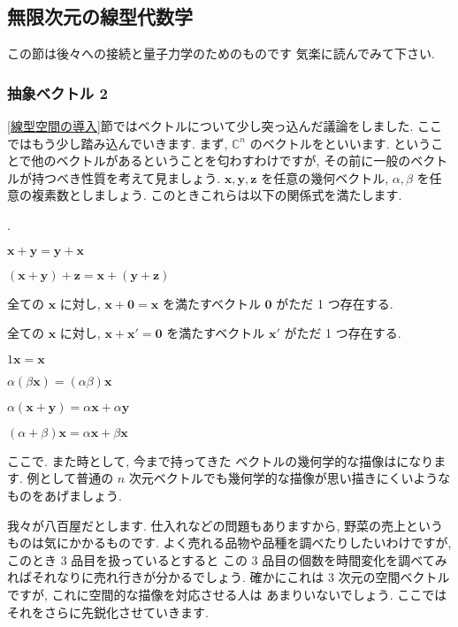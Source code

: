\documentclass[openany, a4paper, oneside]{book}
\newcounter{enum2}
\renewenvironment{enumerate}{%
\begin{list}%
{%
\arabic{enum2}.\ \,%
}%
{%
\usecounter{enum2}
\setlength{\itemindent}{0pt}%
\setlength{\leftmargin}{6pt}%
\setlength{\rightmargin}{0pt}%
\setlength{\labelsep}{0pt}%
\setlength{\labelwidth}{6pt}%
\setlength{\itemsep}{0pt}%
\setlength{\parsep}{0pt}%
\setlength{\listparindent}{0pt}%
}
}{%
\end{list}%
}
\theoremstyle{break}
\theoremstyle{breakdefn}
\newcommand{\bC}{\mathbb{C}}
\begin{document}
\subsection{無限次元の線型代数学}
\label{sec-4-3-2-10}

この節は後々への接続と量子力学のためのものです
気楽に読んでみて下さい.
\subsubsection{抽象ベクトル 2}
\label{sec-4-3-2-10-1}

\ref{線型空間の導入}節ではベクトルについて少し突っ込んだ議論をしました.
ここではもう少し踏み込んでいきます.
まず,  $\bC^n$ のベクトルをといいます.
ということで他のベクトルがあるということを匂わすわけですが,
その前に一般のベクトルが持つべき性質を考えて見ましょう.
 $\bm{x},\bm{y},\bm{z}$ を任意の幾何ベクトル,  $\alpha, \beta$ を任意の複素数としましょう.
このときこれらは以下の関係式を満たします.
    \begin{enumerate}
        \item  $\bm{x} + \bm{y} = \bm{y} + \bm{x}$
        \item  $(\bm{x} + \bm{y} ) + \bm{z} = \bm{x} + ( \bm{y} + \bm{z})$
        \item 全ての $\bm{x}$ に対し,  $\bm{x} + \bm{0} = \bm{x}$ を満たすベクトル $\bm{0}$ がただ 1 つ存在する.
        \item 全ての $\bm{x}$ に対し,  $\bm{x} + \bm{x}' = \bm{0}$ を満たすベクトル $\bm{x}'$ がただ 1 つ存在する.
        \item  $1\bm{x} = \bm{x}$
        \item  $\alpha (\beta \bm{x}) = (\alpha \beta) \bm{x}$
        \item  $\alpha (\bm{x} + \bm{y} ) = \alpha \bm{x} + \alpha \bm{y}$
        \item  $(\alpha + \beta ) \bm{x} = \alpha \bm{x} + \beta \bm{x}$
    \end{enumerate}

ここで. また時として, 今まで持ってきた
ベクトルの幾何学的な描像はになります.
例として普通の $n$ 次元ベクトルでも幾何学的な描像が思い描きにくいようなものをあげましょう.

我々が八百屋だとします. 仕入れなどの問題もありますから, 野菜の売上というものは気にかかるものです.
よく売れる品物や品種を調べたりしたいわけですが, このとき $3$ 品目を扱っているとすると
この $3$ 品目の個数を時間変化を調べてみればそれなりに売れ行きが分かるでしょう.
確かにこれは $3$ 次元の空間ベクトルですが, これに空間的な描像を対応させる人は
あまりいないでしょう.
ここではそれをさらに先鋭化させていきます.
\end{document}
